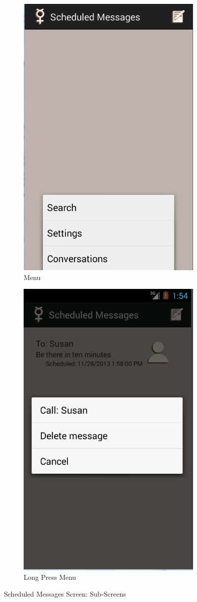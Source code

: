 \documentclass{article}
\begin{document}
\begin{figure}[h!]
\centering
	\begin{subfigure}[b]{0.49\textwidth}
		\includegraphics[width=.49\textwidth]{"./Screen_shots/Scheduled_MessagE_Screen_Menu"}{}
		\caption{Menu}
		\label{fig:SchedScreenMenu}
	\end{subfigure} %
	\begin{subfigure}[b]{0.49\textwidth}
\includegraphics[width=.49\textwidth]{"./Screen_shots/Scheduled_MessagE_Screen_Long_Press"}{}
\caption{Long Press Menu}
\label{fig:SchedScreenLong}
	\end{subfigure}
	\caption{Scheduled Messages Screen: Sub-Screens}

\end{figure}
\end{document}
